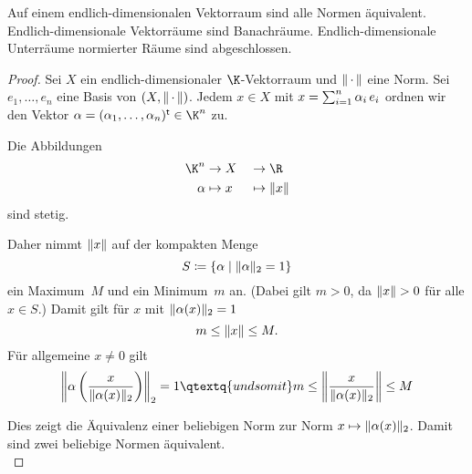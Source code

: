 \begin{thSatz}
    Auf einem endlich-dimensionalen Vektorraum sind alle Normen äquivalent.
    Endlich-dimensionale Vektorräume sind Banachräume. Endlich-dimensionale
    Unterräume normierter Räume sind abgeschlossen.
\end{thSatz}

\begin{proof}
    Sei $X$ ein endlich-dimensionaler $\K$-Vektorraum und $\emptyNorm$ eine Norm.
    Sei $e_1,\dots,e_n$ eine Basis von $(X,\emptyNorm)$. 
    Jedem $x\in X$ mit $x=\isum[1]^n \alpha_i\,e_i$ ordnen wir den Vektor
    $\alpha=(\alpha_1,\dots,\alpha_n)\mt \in\K^n$ zu.
    
    Die Abbildungen
    \begin{alignat*}{2}
        \K^n   &\to X     &&\to\R \\
        \alpha &\mapsto x &&\mapsto\norm{x}
    \end{alignat*}
    sind stetig.
    
    Daher nimmt $\norm{x}$ auf der kompakten Menge
    \[ S \defeq \{ \alpha \Mid \norm{\alpha}_2 = 1 \} \]
    ein Maximum~$M$ und ein Minimum~$m$ an. (Dabei gilt $m>0$, da $\norm{x}>0$
    für alle $x\in S$.)
    Damit gilt für $x$ mit $\norm{\alpha(x)}_2 = 1$
    \[ m \leq \norm{x} \leq M . \]
    Für allgemeine $x\neq0$ gilt
    \[ \norm*{ \alpha\left(\frac{x}{\norm{\alpha(x)}_2}\right) }_2 = 1 
        \qtextq{und somit}
        m \leq \norm*{\frac{x}{\norm{\alpha(x)}_2}} \leq M
    \]
    
    Dies zeigt die Äquivalenz einer beliebigen Norm zur Norm
    $x\mapsto\norm{\alpha(x)}_2$. Damit sind zwei beliebige Normen äquivalent.
    \\
\end{proof}



